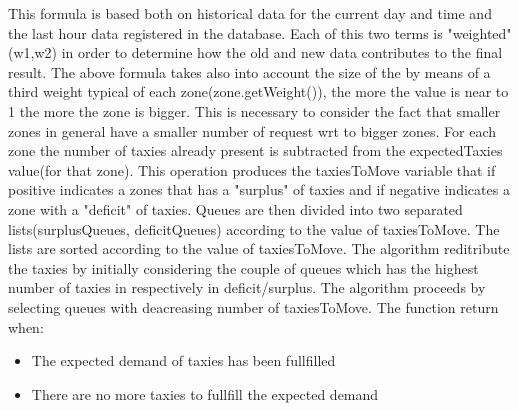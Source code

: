 \documentclass[11pt,titlepage]{article} %
\begin{document}
  This formula is based both on historical data for the current day and time and
  the last hour data registered in the database.
  Each of this two terms is "weighted" (w1,w2) in order to determine how
  the old and new data contributes to the final result.
  The above formula takes also into account the size of the by means of a third
  weight typical of each zone(zone.getWeight()), the more the value is near to 1
  the more the zone is bigger. This is necessary to consider the fact that smaller
  zones in general have a smaller number of request wrt to bigger zones.
  For each zone the number of taxies already present is subtracted from the
  expectedTaxies value(for that zone). This operation produces the taxiesToMove
  variable that if positive indicates a zones that has a "surplus" of taxies and
  if negative indicates a zone with a "deficit" of taxies.
  Queues are then divided into two separated lists(surplusQueues, deficitQueues)
  according to the value of taxiesToMove.
  The lists are sorted according to the value of taxiesToMove.
  The algorithm reditribute the taxies by initially considering the couple of queues which
  has the highest number of taxies in respectively in deficit/surplus.
  The algorithm proceeds by selecting queues with deacreasing number of taxiesToMove.
  The function return when:
\begin{itemize}
    \item The expected demand of taxies has been fullfilled
    \item There are no more taxies to fullfill the expected demand
\end{itemize}
\end{document}
